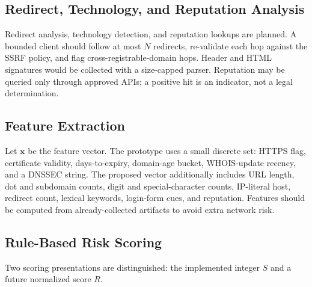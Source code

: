 \documentclass[conference]{IEEEtran}
\begin{document}
\subsection{Redirect, Technology, and Reputation Analysis}
Redirect analysis, technology detection, and reputation lookups are planned. A bounded client should follow at most $N$ redirects, re-validate each hop against the SSRF policy, and flag cross-registrable-domain hops. Header and HTML signatures would be collected with a size-capped parser. Reputation may be queried only through approved APIs; a positive hit is an indicator, not a legal determination.

\subsection{Feature Extraction}
Let $\mathbf{x}$ be the feature vector. The prototype uses a small discrete set: HTTPS flag, certificate validity, days-to-expiry, domain-age bucket, WHOIS-update recency, and a DNSSEC string. The proposed vector additionally includes URL length, dot and subdomain counts, digit and special-character counts, IP-literal host, redirect count, lexical keywords, login-form cues, and reputation. Features should be computed from already-collected artifacts to avoid extra network risk.

\subsection{Rule-Based Risk Scoring}
\label{sec:score}
Two scoring presentations are distinguished: the implemented integer $S$ and a future normalized score $R$.
\end{document}
